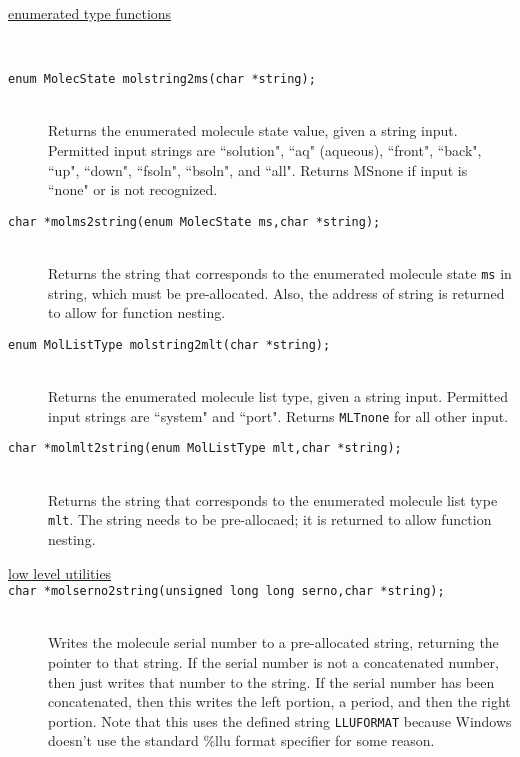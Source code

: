\documentclass {book}
\begin{document}
\begin{description}

\item[\underline{enumerated type functions}]
\hfill \\

\item[\texttt{enum MolecState molstring2ms(char *string);}]
\hfill \\
Returns the enumerated molecule state value, given a string input.  Permitted input strings are ``solution", ``aq" (aqueous), ``front", ``back", ``up", ``down", ``fsoln", ``bsoln", and ``all".  Returns MSnone if input is ``none" or is not recognized.

\item[\texttt{char *molms2string(enum MolecState ms,char *string);}]
\hfill \\
Returns the string that corresponds to the enumerated molecule state \texttt{ms} in string, which must be pre-allocated.  Also, the address of string is returned to allow for function nesting.

\item[\texttt{enum MolListType molstring2mlt(char *string);}]
\hfill \\
Returns the enumerated molecule list type, given a string input.  Permitted input strings are ``system" and ``port".  Returns \texttt{MLTnone} for all other input.

\item[\texttt{char *molmlt2string(enum MolListType mlt,char *string);}]
\hfill \\
Returns the string that corresponds to the enumerated molecule list type \texttt{mlt}.  The string needs to be pre-allocaed; it is returned to allow function nesting.

\item[\underline{low level utilities}]

\item[\texttt{char *molserno2string(unsigned long long serno,char *string);}]
\hfill \\
Writes the molecule serial number to a pre-allocated string, returning the pointer to that string. If the serial number is not a concatenated number, then just writes that number to the string. If the serial number has been concatenated, then this writes the left portion, a period, and then the right portion. Note that this uses the defined string \texttt{LLUFORMAT} because Windows doesn't use the standard \%llu format specifier for some reason.


\end{description}
\end{document}
